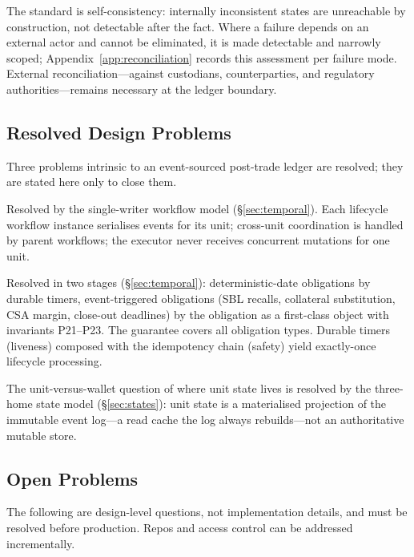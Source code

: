 \documentclass[11pt,a4paper]{article}
\begin{document}
The standard is self-consistency: internally inconsistent states are unreachable by construction, not detectable after the fact. Where a failure depends on an external actor and cannot be eliminated, it is made detectable and narrowly scoped; Appendix~\ref{app:reconciliation} records this assessment per failure mode. External reconciliation---against custodians, counterparties, and regulatory authorities---remains necessary at the ledger boundary.

\subsection{Resolved Design Problems}

Three problems intrinsic to an event-sourced post-trade ledger are resolved; they are stated here only to close them.

\begin{description}[nosep]
\item[Concurrency.] Resolved by the single-writer workflow model (\S\ref{sec:temporal}). Each lifecycle workflow instance serialises events for its unit; cross-unit coordination is handled by parent workflows; the executor never receives concurrent mutations for one unit.
\item[Liveness.] Resolved in two stages (\S\ref{sec:temporal}): deterministic-date obligations by durable timers, event-triggered obligations (SBL recalls, collateral substitution, CSA margin, close-out deadlines) by the obligation as a first-class object with invariants P21--P23. The guarantee covers all obligation types. Durable timers (liveness) composed with the idempotency chain (safety) yield exactly-once lifecycle processing.
\item[State attachment.] The unit-versus-wallet question of where unit state lives is resolved by the three-home state model (\S\ref{sec:states}): unit state is a materialised projection of the immutable event log---a read cache the log always rebuilds---not an authoritative mutable store.
\end{description}

\subsection{Open Problems}

The following are design-level questions, not implementation details, and must be resolved before production. Repos and access control can be addressed incrementally.
\end{document}
